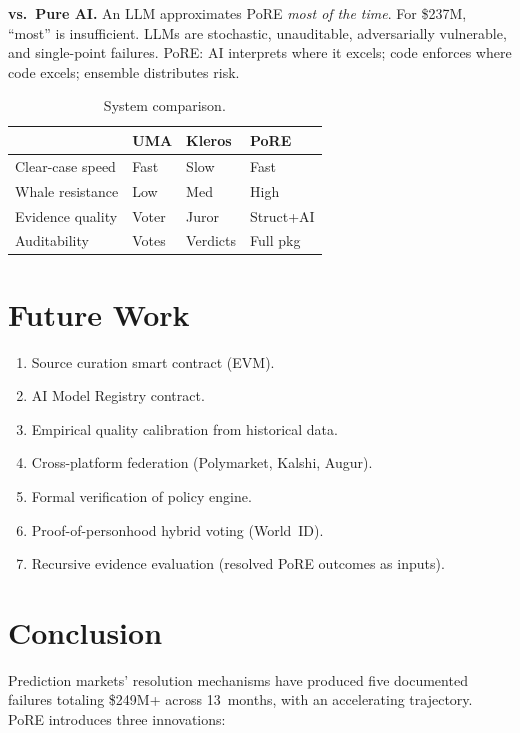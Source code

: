 \documentclass[11pt,a4paper,twocolumn]{article}
\begin{document}
\textbf{vs.\ Pure AI.} An LLM approximates PoRE \emph{most of the time}. For \$237M, ``most'' is insufficient. LLMs are stochastic, unauditable, adversarially vulnerable, and single-point failures. PoRE: AI interprets where it excels; code enforces where code excels; ensemble distributes risk.

\begin{table}[H]
\centering
\caption{System comparison.}
\label{tab:compare}
\scriptsize
\begin{tabularx}{\columnwidth}{@{}lXXX@{}}
\toprule
& \textbf{UMA} & \textbf{Kleros} & \textbf{PoRE} \\
\midrule
Clear-case speed & Fast & Slow & Fast \\
Whale resistance & Low & Med & High \\
Evidence quality & Voter & Juror & Struct+AI \\
Auditability & Votes & Verdicts & Full pkg \\
\bottomrule
\end{tabularx}
\end{table}

\section{Future Work}

\begin{enumerate}[nosep,leftmargin=*]
    \item Source curation smart contract (EVM).
    \item AI Model Registry contract.
    \item Empirical quality calibration from historical data.
    \item Cross-platform federation (Polymarket, Kalshi, Augur).
    \item Formal verification of policy engine.
    \item Proof-of-personhood hybrid voting (World~ID).
    \item Recursive evidence evaluation (resolved PoRE outcomes as inputs).
\end{enumerate}

\section{Conclusion}

Prediction markets' resolution mechanisms have produced five documented failures totaling \$249M+ across 13~months, with an accelerating trajectory. PoRE introduces three innovations:
\end{document}
